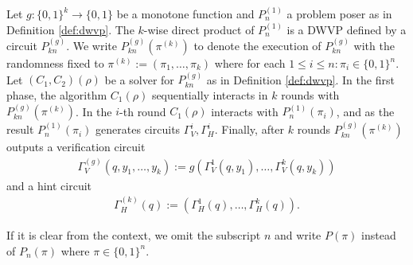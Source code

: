 \noindent
%
\begin{definition}
  Let $g: \{0,1\}^{k} \rightarrow \{0,1\}$ be a monotone function and $P_n^{(1)}$ a problem poser as in Definition \ref{def:dwvp}.
  The $k$-wise direct product of $P_n^{(1)}$ is a DWVP defined by a circuit $P_{kn}^{(g)}$.
  We write $P_{kn}^{(g)}(\pi^{(k)})$ to denote the execution of $P_{kn}^{(g)}$ with the randomness fixed to $\pi^{(k)} := (\pi_1, \dots, \pi_k)$
  where for each $1 \leq i \leq n : \pi_i \in \{0,1\}^n.$
  Let $(C_1, C_2)(\rho)$ be a solver for $P_{kn}^{(g)}$ as in Definition \ref{def:dwvp}.
  In the first phase, the algorithm $C_1(\rho)$ sequentially interacts in $k$ rounds with $P_{kn}^{(g)}(\pi^{(k)})$.
  In the $i$-th round $C_1(\rho)$ interacts with $P_n^{(1)}(\pi_i)$,
  and as the result $P_{n}^{(1)}(\pi_i)$ generates circuits $\Gamma_V^i, \Gamma_H^i$.
  Finally, after $k$ rounds $P_{kn}^{(g)}(\pi^{(k)})$ outputs a verification circuit
\begin{align*}
  \Gamma_V^{(g)} (q, y_1, \dots, y_k) := g(\Gamma_V^{1}(q, y_1), \dots, \Gamma_V^{k}(q, y_k))
\end{align*}
and a hint circuit
\begin{align*}
  \Gamma_H^{(k)} (q) := (\Gamma_H^{1}(q), \dots, \Gamma_H^{k}(q)).
\end{align*}
\end{definition}
%
If it is clear from the context, we omit the subscript $n$ and write $P(\pi)$ instead of $P_n(\pi)$ where $\pi \in \{0,1\}^{n}$.


